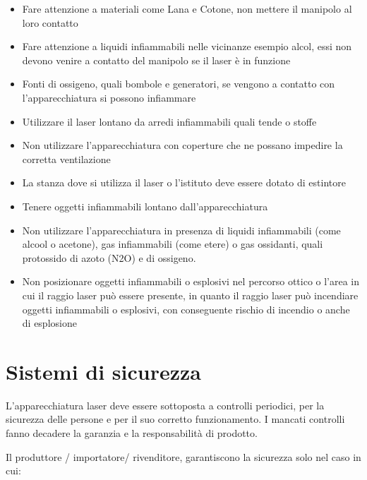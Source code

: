 \documentclass[10pt]{article}
\begin{document}
\begin{itemize}
  \item Fare attenzione a materiali come Lana e Cotone, non mettere il manipolo al loro contatto
  \item Fare attenzione a liquidi infiammabili nelle vicinanze esempio alcol, essi non devono venire a contatto del manipolo se il laser è in funzione
  \item Fonti di ossigeno, quali bombole e generatori, se vengono a contatto con l'apparecchiatura si possono infiammare
  \item Utilizzare il laser lontano da arredi infiammabili quali tende o stoffe
  \item Non utilizzare l'apparecchiatura con coperture che ne possano impedire la corretta ventilazione
  \item La stanza dove si utilizza il laser o l'istituto deve essere dotato di estintore
  \item Tenere oggetti infiammabili lontano dall’apparecchiatura
  \item Non utilizzare l'apparecchiatura in presenza di liquidi infiammabili (come alcool o acetone), gas infiammabili (come etere) o gas ossidanti, quali protossido di azoto (N2O) e di ossigeno.
  \item Non posizionare oggetti infiammabili o esplosivi nel percorso ottico o l'area in cui il raggio laser può essere presente, in quanto il raggio laser può incendiare oggetti infiammabili o esplosivi, con conseguente rischio di incendio o anche di esplosione
\end{itemize}

\section{Sistemi di sicurezza}
L'apparecchiatura laser deve essere sottoposta a controlli periodici, per la sicurezza delle persone e per il suo corretto funzionamento. I mancati controlli fanno decadere la garanzia e la responsabilità di prodotto.

Il produttore / importatore/ rivenditore, garantiscono la sicurezza solo nel caso in cui:
\end{document}
